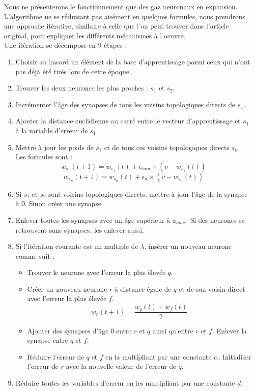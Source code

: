 	Nous ne présenterons le fonctionnement que des gaz neuronaux en expansion. L'algorithme ne se réduisant pas aisément en quelques formules, nous prendrons une approche itérative, similaire à celle que l'on peut trouver dans l'article original, pour expliquer les différents mécanismes à l'oeuvre.\\

	Une itération se décompose en 9 étapes :
	\begin{enumerate}
		\item Choisir au hasard un élément de la base d'apprentissage parmi ceux qui n'ont pas déjà été tirés lors de cette époque.
		\item Trouver les deux neurones les plus proches : $s_1$ et $s_2$.
		\item Incrémenter l'âge des synapses de tous les voisins topologiques directs de $s_1$.
		\item Ajouter la distance euclidienne au carré entre le vecteur d'apprentissage et $s_1$ à la variable d'erreur de $s_1$.
		\item Mettre à jour les poids de $s_1$ et de tous ces voisins topologiques directs $s_n$. Les formules sont :
		\begin{equation}
			w_{s_1}(t+1) = w_{s_1}(t) + \epsilon_{\textit{bmu}} \times (v - w_{s_1}(t))
		\end{equation}
		\begin{equation}
			w_{s_n}(t+1) = w_{s_n}(t) + \epsilon_{n} \times (v - w_{s_n}(t))
		\end{equation}
		\item Si $s_1$ et $s_2$ sont voisins topologiques directs, mettre à jour l'âge de la synapse à 0. Sinon créer une synapse.
		\item Enlever toutes les synapses avec un âge supérieur à $a_{\textit{max}}$. Si des neurones se retrouvent sans synapses, les enlever aussi.
		\item Si l'itération courante est un multiple de $\lambda$, insérer un nouveau neurone comme suit :
		\begin{itemize}
			\item Trouver le neurone avec l'erreur la plus élevée $q$.
			\item Créer un nouveau neurone $r$ à distance égale de $q$ et de son voisin direct avec l'erreur la plus élevée $f$.
			\begin{equation}
				w_r(t+1) = \frac{w_q(t) + w_f(t)}{2}  
			\end{equation}
			\item Ajouter des synapses d'âge 0 entre $r$ et $q$ ainsi qu'entre $r$ et $f$. Enlever la synapse entre $q$ et $f$.
			\item Réduire l'erreur de $q$ et $f$ en la multipliant par une constante $\alpha$. Initialiser l'erreur de $r$ avec la nouvelle valeur de l'erreur de $q$.
		\end{itemize}
		\item Réduire toutes les variables d'erreur en les multipliant par une constante $d$.
	\end{enumerate}\text{\\}

